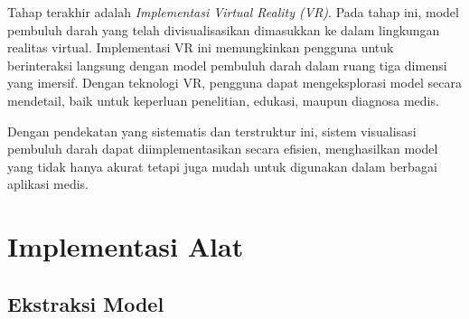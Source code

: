 Tahap terakhir adalah \textit{Implementasi Virtual Reality (VR)}. Pada tahap ini, model pembuluh darah yang telah divisualisasikan dimasukkan ke dalam lingkungan realitas virtual. Implementasi VR ini memungkinkan pengguna untuk berinteraksi langsung dengan model pembuluh darah dalam ruang tiga dimensi yang imersif. Dengan teknologi VR, pengguna dapat mengeksplorasi model secara mendetail, baik untuk keperluan penelitian, edukasi, maupun diagnosa medis.

Dengan pendekatan yang sistematis dan terstruktur ini, sistem visualisasi pembuluh darah dapat diimplementasikan secara efisien, menghasilkan model yang tidak hanya akurat tetapi juga mudah untuk digunakan dalam berbagai aplikasi medis.

\section{Implementasi Alat}
\label{sec:implementasi alat}

\subsection{Ekstraksi Model}

